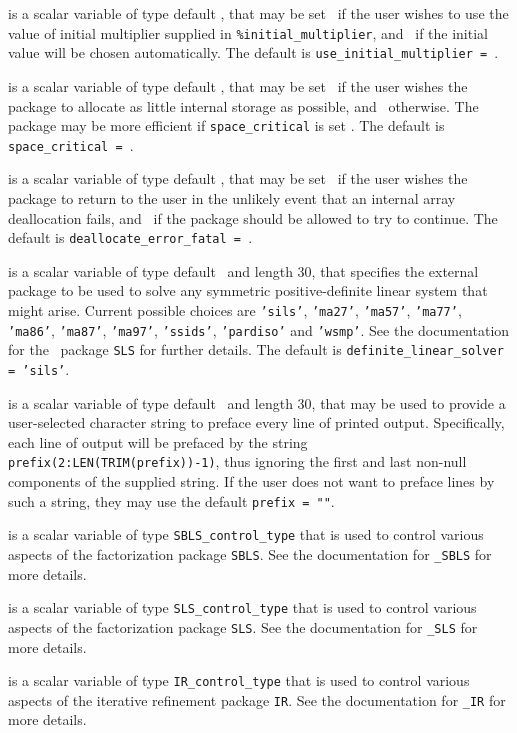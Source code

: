 \documentclass{galahad}
\begin{document}
\begin{description}
 is a scalar variable of type default \logical,
that may be set \true\ if the user wishes to use the value of initial
multiplier supplied in {\tt \%initial\_multiplier},
and \false\ if the initial value will be chosen automatically.
The default is {\tt use\_initial\_multiplier = \false}.

 is a scalar variable of type default \logical, that
may be set \true\ if the user wishes the package to allocate as little
internal storage as possible, and \false\ otherwise. The package may
be more efficient if {\tt space\_critical} is set \false.
The default is {\tt space\_critical = \false}.

 is a scalar variable of type default \logical,
that may be set \true\ if the user wishes the package to return to the user
in the unlikely event that an internal array deallocation fails,
and \false\ if the package should be allowed to try to continue.
The default is {\tt deallocate\_error\_fatal = \false}.

 is a scalar variable of type default \character\
and length 30, that specifies the external package to be used to
solve any symmetric positive-definite linear system that might arise.
Current possible
choices are {\tt 'sils'}, {\tt 'ma27'}, {\tt 'ma57'}, {\tt 'ma77'},
{\tt 'ma86'}, {\tt 'ma87'}, {\tt 'ma97'}, {\tt 'ssids'}, {\tt 'pardiso'}
and {\tt 'wsmp'}.
See the documentation for the \galahad\ package {\tt SLS} for further details.
The default is {\tt definite\_linear\_solver = 'sils'}.

 is a scalar variable of type default \character\
and length 30, that may be used to provide a user-selected
character string to preface every line of printed output.
Specifically, each line of output will be prefaced by the string
{\tt prefix(2:LEN(TRIM(prefix))-1)},
thus ignoring the first and last non-null components of the
supplied string. If the user does not want to preface lines by such
a string, they may use the default {\tt prefix = ""}.

 is a scalar variable of type
{\tt SBLS\_control\_type} that is used to control various aspects of the
factorization package {\tt SBLS}. See the documentation for
{\tt \libraryname\_SBLS} for more details.

 is a scalar variable of type
{\tt SLS\_control\_type} that is used to control various aspects of the
factorization package {\tt SLS}. See the documentation for
{\tt \libraryname\_SLS} for more details.

 is a scalar variable of type
{\tt IR\_control\_type} that is used to control various aspects of the
iterative refinement package {\tt IR}. See the documentation for
{\tt \libraryname\_IR} for more details.

\end{description}
\end{document}
